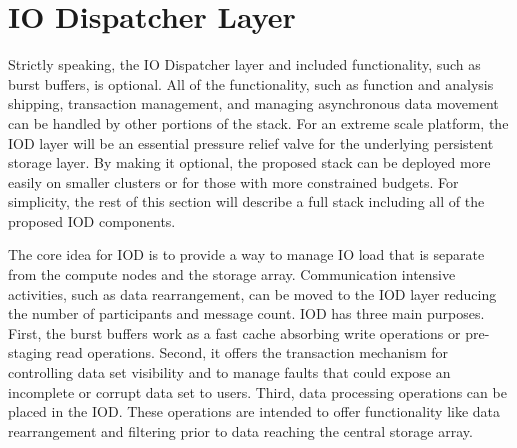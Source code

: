 \documentclass{sig-alt-gov2}
\begin{document}
\section{IO Dispatcher Layer}
\label{sec:iod}

Strictly speaking, the IO Dispatcher layer and included functionality, such as
burst buffers, is optional. All of the functionality, such as function and
analysis shipping, transaction management, and managing asynchronous data
movement can be handled by other portions of the stack. For an extreme scale
platform, the IOD layer will be an essential pressure relief valve for the
underlying persistent storage layer. By making it optional, the proposed stack
can be deployed more easily on smaller clusters or for those with more
constrained budgets. For simplicity, the rest of this section will describe a
full stack including all of the proposed IOD components.

The core idea for IOD is to provide a way to manage IO load that is
separate from the compute nodes and the storage array. Communication intensive
activities, such as data rearrangement, can be moved to the IOD layer
reducing the number of participants and message count. IOD has three main
purposes. First, the burst buffers work as a fast cache absorbing write
operations or pre-staging read operations.
Second, it offers the transaction mechanism for controlling data set visibility
and to manage faults that could expose an incomplete or corrupt data set to
users.
Third, data processing operations can be placed in the IOD.
These operations are intended to offer functionality like data rearrangement
and filtering prior to data reaching the central storage array.

\end{document}
